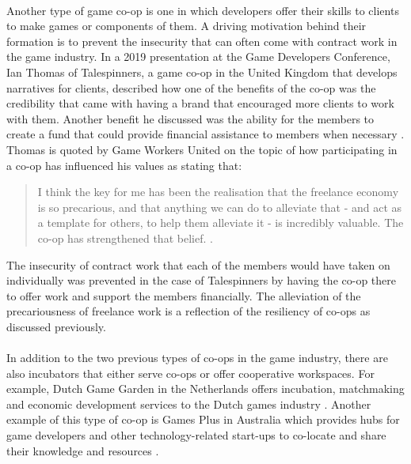 \paragraph{} Another type of game co-op is one in which developers offer their skills to clients to make games or components of them. A driving motivation behind their formation is to prevent the insecurity that can often come with contract work in the game industry. In a 2019 presentation at the Game Developers Conference, Ian Thomas of Talespinners, a game co-op in the United Kingdom that develops narratives for clients, described how one of the benefits of the co-op was the credibility that came with having a brand that encouraged more clients to work with them. Another benefit he discussed was the ability for the members to create a fund that could provide financial assistance to members when necessary \autocite{game_developers_conference_embracing_2019}. Thomas is quoted by Game Workers United on the topic of how participating in a co-op has influenced his values as stating that:

\begin{quote}
    \item{} I think the key for me has been the realisation that the freelance economy is so precarious, and that anything we can do to alleviate that - and act as a template for others, to help them alleviate it - is incredibly valuable. The co-op has strengthened that belief. \autocite{game_workers_unite_worker_2021}.
\end{quote}

The insecurity of contract work that each of the members would have taken on individually was prevented in the case of Talespinners by having the co-op there to offer work and support the members financially. The alleviation of the precariousness of freelance work is a reflection of the resiliency of co-ops as discussed previously.

\paragraph{} In addition to the two previous types of co-ops in the game industry, there are also incubators that either serve co-ops or offer cooperative workspaces. For example, Dutch Game Garden in the Netherlands offers incubation, matchmaking and economic development services to the Dutch games industry \autocite{dutch_game_garden_about_nodate}. Another example of this type of co-op is Games Plus in Australia which provides hubs for game developers and other technology-related start-ups to co-locate and share their knowledge and resources \autocite{game_plus_home_nodate}.

